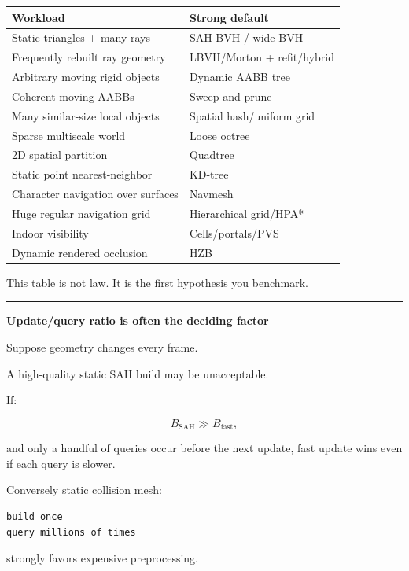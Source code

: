 {\def\LTcaptype{none} %
\begin{longtable}[]{@{}ll@{}}
\toprule\noalign{}
Workload & Strong default \\
\midrule\noalign{}
\endhead
\bottomrule\noalign{}
\endlastfoot
Static triangles + many rays & SAH BVH / wide BVH \\
Frequently rebuilt ray geometry & LBVH/Morton + refit/hybrid \\
Arbitrary moving rigid objects & Dynamic AABB tree \\
Coherent moving AABBs & Sweep-and-prune \\
Many similar-size local objects & Spatial hash/uniform grid \\
Sparse multiscale world & Loose octree \\
2D spatial partition & Quadtree \\
Static point nearest-neighbor & KD-tree \\
Character navigation over surfaces & Navmesh \\
Huge regular navigation grid & Hierarchical grid/HPA* \\
Indoor visibility & Cells/portals/PVS \\
Dynamic rendered occlusion & HZB \\
\end{longtable}
}

This table is not law. It is the first hypothesis you benchmark.

\begin{center}\rule{0.5\linewidth}{0.5pt}\end{center}

\textbf{Update/query ratio is often the deciding factor}

Suppose geometry changes every frame.

A high-quality static SAH build may be unacceptable.

If:

\[
B_{\text{SAH}}
\gg
B_{\text{fast}},
\]

and only a handful of queries occur before the next update, fast update wins even if each query is slower.

Conversely static collision mesh:

\begin{verbatim}
build once
query millions of times
\end{verbatim}

strongly favors expensive preprocessing.

